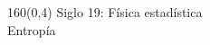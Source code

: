\documentclass[shownotes,aspectratio=169]{beamer}
\begin{document}
\begin{frame}[plain]
\begin{textblock}{160}(0,4)
\centering \LARGE Siglo 19: Física estadística \\
\large Entropía
\end{textblock}

%
%
%
%
%
%

\end{frame}
\end{document}
